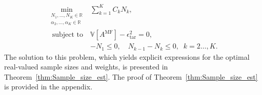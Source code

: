 %
\begin{equation}\label{eq:Optimization_pb_sample_size}
    \begin{array}{ll}
    \min \limits_{\begin{array}{c}\scriptstyle N_1,\ldots, N_K\in \mathbb{R} \\[-4pt]
\scriptstyle \alpha_2,\ldots,\alpha_K\in \mathbb{R}
\end{array}} &\displaystyle\sum\limits_{k=1}^K C_kN_k,\\
       \;\,\text{subject to} &\mathbb{V}\left[A^{\text{MF}}\right]- \epsilon_{\text{tar}}^2 = 0,\\[2pt]
       &\displaystyle -N_1\le 0,\quad \displaystyle N_{k-1}-N_k\le 0, \;\; k=2\ldots,K.
    \end{array}
\end{equation}
%
The solution to this problem, which yields explicit expressions for the optimal real-valued sample sizes and weights, is presented in Theorem~\ref{thm:Sample_size_est}. The proof of Theorem~\ref{thm:Sample_size_est} is provided in the appendix.




